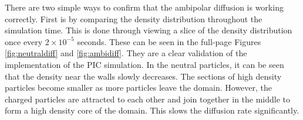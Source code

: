 \indent There are two simple ways to confirm that the ambipolar diffusion is working correctly. First is by comparing the density distribution throughout the simulation time. This is done through viewing a slice of the density distribution once every \(2\times 10^{-5}\) seconds. These can be seen in the full-page Figures \ref{fig:neutraldiff} and \ref{fig:ambidiff}. They are a clear validation of the implementation of the PIC simulation. In the neutral particles, it can be seen that the density near the walls slowly decreases. The sections of high density particles become smaller as more particles leave the domain. However, the charged particles are attracted to each other and join together in the middle to form a high density core of the domain. This slows the diffusion rate significantly. \par


